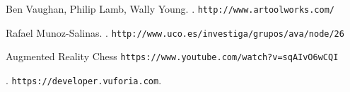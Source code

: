 \documentclass[pdflatex,11pt]{aghdpl}
\author{Ksawery Głaz}
\date{2016}
\begin{document}
\titlepages

\tableofcontents
\clearpage









% 
% 



\begin{thebibliography}{1}

Ben Vaughan, Philip Lamb, Wally Young.
.
\newblock \texttt{http://www.artoolworks.com/}
\newblock {}

Rafael Munoz-Salinas.
.
\newblock \texttt{http://www.uco.es/investiga/grupos/ava/node/26}

Augmented Reality Chess
\newblock \texttt{https://www.youtube.com/watch?v=sqAIvO6wCQI}

.
\newblock \texttt{https://developer.vuforia.com}.

\end{thebibliography}
\end{document}
